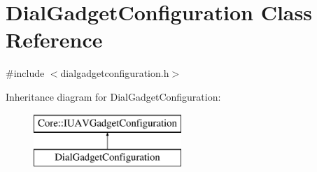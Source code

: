 \hypertarget{class_dial_gadget_configuration}{\section{\-Dial\-Gadget\-Configuration \-Class \-Reference}
\label{class_dial_gadget_configuration}
}


{\ttfamily \#include $<$dialgadgetconfiguration.\-h$>$}

\-Inheritance diagram for \-Dial\-Gadget\-Configuration\-:\begin{figure}[H]
\begin{center}
\leavevmode
\includegraphics[height=2.000000cm]{class_dial_gadget_configuration}
\end{center}
\end{figure}

